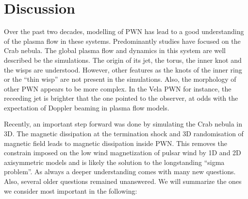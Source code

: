 \section{Discussion}
\label{sec:discussion}

Over the past two decades, modelling of PWN has lead to a good understanding of the plasma flow in these systems. Predominantly studies have focused on the Crab nebula.  The global plasma flow and dynamics in this system are well described be the simulations. The origin of its jet, the torus, the inner knot and the wisps are understood. However, other features as the knots of the inner ring or the ``thin wisp'' \cite{Hester_1995} are not present in the simulations. Also, the morphology of other PWN appears to be more complex. In the Vela PWN for instance, the receeding jet is brighter that the one pointed to the observer, at odds with the expectation of Doppler beaming in plasma flow models.

Recently, an important step forward was done by simulating the Crab nebula in 3D. The magnetic dissipation at the termination shock and 3D randomisation of magnetic field leads to magnetic dissipation  inside PWN. This removes the constrain imposed on the low wind magnetization of pulsar wind by 1D and 2D axisymmetric models and is likely the solution to the longstanding ``sigma problem''. As always a deeper understanding comes with many new questions. Also, several older questions remained unanswered. We will summarize the ones we consider most important in the following: 

